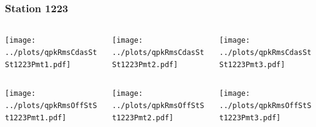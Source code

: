 \documentclass[aspectratio=169]{beamer}
\begin{document}
\begin{frame} 
  \frametitle{Station 1223}
  \begin{center}
    \begin{columns}
      \begin{column}{0.33\textwidth}
        \texttt{[image: ../plots/qpkRmsCdasStSt1223Pmt1.pdf]}
      \end{column}
      \begin{column}{0.33\textwidth}
        \texttt{[image: ../plots/qpkRmsCdasStSt1223Pmt2.pdf]}
      \end{column}
      \begin{column}{0.33\textwidth}
        \texttt{[image: ../plots/qpkRmsCdasStSt1223Pmt3.pdf]}
      \end{column}
    \end{columns}
  \end{center}

  \begin{center}
    \begin{columns}
      \begin{column}{0.33\textwidth}
        \texttt{[image: ../plots/qpkRmsOffStSt1223Pmt1.pdf]}
      \end{column}
      \begin{column}{0.33\textwidth}
        \texttt{[image: ../plots/qpkRmsOffStSt1223Pmt2.pdf]}
      \end{column}
      \begin{column}{0.33\textwidth}
        \texttt{[image: ../plots/qpkRmsOffStSt1223Pmt3.pdf]}
      \end{column}
    \end{columns}
  \end{center}
\end{frame}
\end{document}
